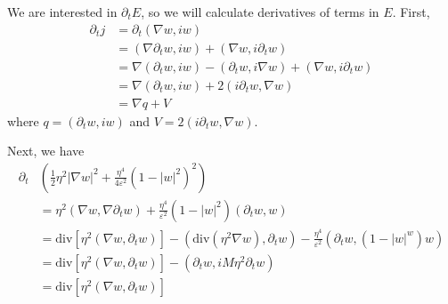 \documentclass[a4paper]{article}
\renewcommand{\div}{\mathrm{div}}
\begin{document}
We are interested in $\partial_t E$, so we will calculate derivatives of terms in $E$.
First,
\begin{align*}
  \partial_t j &= \partial_t ( \nabla w, iw ) \\
  &= ( \nabla \partial_t w, iw ) + ( \nabla w, i \partial_t w) \\
  &= \nabla ( \partial_t w, iw ) - ( \partial_t w, i \nabla w ) + ( \nabla w, i \partial_t w ) \\
  &= \nabla ( \partial_t w, iw ) + 2( i \partial_t w, \nabla w ) \\
  &= \nabla q + V
\end{align*}
where $q = (\partial_t w, iw )$ and $V = 2 (i \partial_t w, \nabla w)$.

Next, we have
\begin{align*}
  \partial_t &( \frac{1}{2} \eta^2 |\nabla w|^2 + \frac{\eta^4}{4\varepsilon^2} ( 1 - |w|^2)^2 ) \\
  &= \eta^2 ( \nabla w, \nabla \partial_t w ) + \frac{\eta^4}{\varepsilon^2} ( 1 - |w|^2 )(\partial_t w, w) \\
  &= \div \left[ \eta^2 ( \nabla w, \partial_t w) \right] - ( \div(\eta^2 \nabla w), \partial_t w) - \frac{\eta^4}{\varepsilon^2} ( \partial_t w,
  (1-|w|^w)w) \\
  &= \div \left[ \eta^2 ( \nabla w, \partial_t w) \right] - ( \partial_t w, i M \eta^2 \partial_t w ) \\
  &= \div \left[ \eta^2 ( \nabla w, \partial_t w) \right]
\end{align*}
\end{document}

